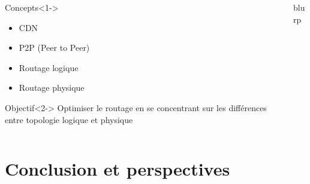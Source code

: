 \documentclass{beamer}
\begin{document}
\begin{frame}
	\begin{columns}
		\begin{column}[l]{0.65\linewidth}
	\begin{block}{Concepts}<1->
		\begin{itemize}
			\item CDN
			\item P2P (Peer to Peer) %
			\item Routage logique
			\item Routage physique
		\end{itemize}
	\end{block}
	\begin{alertblock}{Objectif}<2->
		Optimiser le routage en se concentrant sur les différences
		entre topologie logique et physique
	\end{alertblock}
	\end{column}

		\begin{column}[r]{0.35\linewidth}
            blurp
\end{column}
\end{columns}
\end{frame}

\section[Conclusion]{Conclusion et perspectives}


\begin{frame}
	\tableofcontents[currentsection]
\end{frame}
\end{document}
